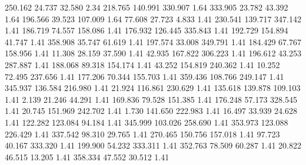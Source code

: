  250.162   24.737   32.580         2.34
 218.765  140.991  330.907         1.64
 333.905   23.782   43.392         1.64
 196.566   39.523  107.009         1.64
  77.608   27.723    4.833         1.41
 230.541  139.717  347.142         1.41
 186.719   74.557  158.086         1.41
 176.932  126.445  335.843         1.41
 192.729  154.894   41.747         1.41
 358.908   35.747   61.619         1.41
 197.574   33.008  349.791         1.41
 184.429   67.767  158.956         1.41
  11.308   28.159   37.590         1.41
  42.935  167.822  306.223         1.41
 196.612   43.253  287.887         1.41
 188.068   89.318  154.174         1.41
  43.252  154.819  240.362         1.41
  10.252   72.495  237.656         1.41
 177.206   70.344  155.703         1.41
 359.436  108.766  249.147         1.41
 345.937  136.584  216.980         1.41
  21.924  116.861  230.629         1.41
 135.618  139.878  109.103         1.41
   2.139   21.246   44.291         1.41
 169.836   79.528  151.385         1.41
 176.248   57.173  328.545         1.41
  20.745  151.969  242.702         1.41
   1.730  141.650  222.983         1.41
  16.497   33.939   24.628         1.41
 122.282  123.084   94.184         1.41
 345.999  103.026  258.690         1.41
 353.973  123.088  226.429         1.41
 337.542   98.310   29.765         1.41
 270.465  150.756  157.018         1.41
  97.723   40.167  333.320         1.41
 199.900   54.232  333.311         1.41
 352.763   78.509   60.287         1.41
  20.822   46.515   13.205         1.41
 358.334   47.552   30.512         1.41
